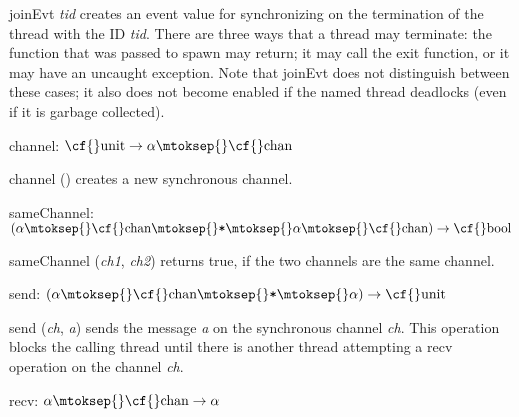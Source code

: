 \begin{descr}
\begin{speccomment}
\item {\cf \small join\-Evt \mbox{\cf \small \textit{tid}}           } 
creates an event value for synchronizing on the termination of 	  the thread with the ID \mbox{\cf \small \textit{tid}}. 	  There are three ways that a thread may terminate: the function that 	  was passed to {\cf \small spawn} may return; it may call the {\cf \small exit} 	  function, or it may have an uncaught exception. 	  Note that {\cf \small join\-Evt} does not distinguish between these 	  cases; it also does not become enabled if the named thread deadlocks 	  (even if it is garbage collected).     \end{speccomment}
\item {}{} {\cf channel: \(\mbox{\cf{}unit}\rightarrow \alpha\mtoksep{}\mbox{\cf{}chan}\)}\label{val-CML.channel}


\begin{speccomment}
\item {\cf \small channel ()           } 
creates a new synchronous channel.     \end{speccomment}
\item {}{} {\cf sameChannel: \((\alpha\mtoksep{}\mbox{\cf{}chan}\mtoksep{}\verb,*,\mtoksep{}\alpha\mtoksep{}\mbox{\cf{}chan})\rightarrow \mbox{\cf{}bool}\)}\label{val-CML.sameChannel}


\begin{speccomment}
\item {\cf \small same\-Channel (\mbox{\cf \small \textit{ch1}}, \mbox{\cf \small \textit{ch2}})           } 
returns true, if the two channels are the same channel.     \end{speccomment}
\item {}{} {\cf send: \((\alpha\mtoksep{}\mbox{\cf{}chan}\mtoksep{}\verb,*,\mtoksep{}\alpha)\rightarrow \mbox{\cf{}unit}\)}\label{val-CML.send}


\begin{speccomment}
\item {\cf \small send (\mbox{\cf \small \textit{ch}}, \mbox{\cf \small \textit{a}})           } 
sends the message \mbox{\cf \small \textit{a}} on the synchronous channel \mbox{\cf \small \textit{ch}}. 	  This operation blocks the calling thread until there is another 	  thread attempting a {\cf \small recv} operation on the channel \mbox{\cf \small \textit{ch}}.     \end{speccomment}
\item {}{} {\cf recv: \(\alpha\mtoksep{}\mbox{\cf{}chan}\rightarrow \alpha\)}\label{val-CML.recv}



\end{descr}
